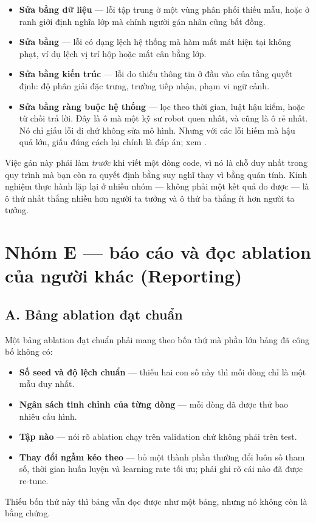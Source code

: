 \documentclass[../../deep_learning.tex]{subfiles}
\begin{document}
\begin{itemize}
\item \textbf{Sửa bằng dữ liệu} --- lỗi tập trung ở một vùng phân phối thiếu mẫu, hoặc ở ranh giới định nghĩa lớp mà chính người gán nhãn cũng bất đồng.
\item \textbf{Sửa bằng } --- lỗi có dạng lệch hệ thống mà hàm mất mát hiện tại không phạt, ví dụ lệch vị trí hộp hoặc mất cân bằng lớp.
\item \textbf{Sửa bằng kiến trúc} --- lỗi do thiếu thông tin ở đầu vào của tầng quyết định: độ phân giải đặc trưng, trường tiếp nhận, phạm vi ngữ cảnh.
\item \textbf{Sửa bằng ràng buộc hệ thống} --- lọc theo thời gian, luật hậu kiểm, hoặc từ chối trả lời. Đây là ô mà một kỹ sư robot quen nhất, và cũng là ô rẻ nhất. Nó chỉ giấu lỗi đi chứ không sửa mô hình. Nhưng với các lỗi hiếm mà hậu quả lớn, giấu đúng cách lại chính là đáp án; xem .
\end{itemize} Việc gán này phải làm \emph{trước} khi viết một dòng code, vì nó là chỗ duy nhất trong quy trình mà bạn còn ra quyết định bằng suy nghĩ thay vì bằng quán tính. Kinh nghiệm thực hành lặp lại ở nhiều nhóm — không phải một kết quả đo được — là ô thứ nhất thắng nhiều hơn người ta tưởng và ô thứ ba thắng ít hơn người ta tưởng.

\section{Nhóm E --- báo cáo và đọc ablation của người khác (Reporting)}

\subsection{A. Bảng ablation đạt chuẩn}
Một bảng ablation đạt chuẩn phải mang theo bốn thứ mà phần lớn bảng đã công bố không có:

\begin{itemize}
\item \textbf{Số seed và độ lệch chuẩn} --- thiếu hai con số này thì mỗi dòng chỉ là một mẫu duy nhất.
\item \textbf{Ngân sách tinh chỉnh của từng dòng} --- mỗi dòng đã được thử bao nhiêu cấu hình.
\item \textbf{Tập nào} --- nói rõ ablation chạy trên validation chứ không phải trên test.
\item \textbf{Thay đổi ngầm kéo theo} --- bỏ một thành phần thường đổi luôn số tham số, thời gian huấn luyện và learning rate tối ưu; phải ghi rõ cái nào đã được re-tune.
\end{itemize} Thiếu bốn thứ này thì bảng vẫn đọc được như một bảng, nhưng nó không còn là bằng chứng.
\end{document}
